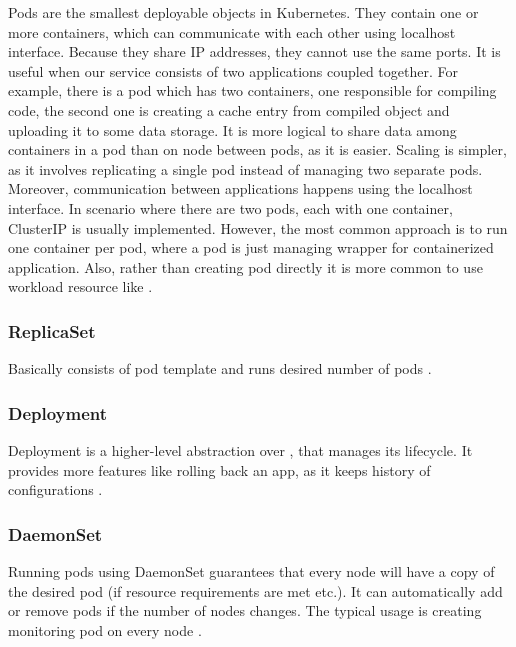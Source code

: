 Pods are the smallest deployable objects in Kubernetes. They contain one or more containers, which can communicate with each other using localhost interface. Because they share IP addresses, they cannot use the same ports. It is useful when our service consists of two applications coupled together. For example, there is a pod which has two containers, one responsible for compiling code, the second one is creating a cache entry from compiled object and uploading it to some data storage. It is more logical to share data among containers in a pod than on node between pods, as it is easier. Scaling is simpler, as it involves replicating a single pod instead of managing two separate pods. Moreover, communication between applications happens using the localhost interface. In scenario where there are two pods, each with one container, ClusterIP \textit{} is usually implemented. However, the most common approach is to run one container per pod, where a pod is just managing wrapper for containerized application. Also, rather than creating pod directly it is more common to use workload resource like \textit{} \cite{KubernetesDocs}. 


\subsubsection{ReplicaSet}
\label{replicaset}

Basically \textit{} consists of pod template and runs desired number of pods \cite{KubernetesDocs}. 


\subsubsection{Deployment}
\label{deployment}

Deployment is a higher-level abstraction over \textit{}, that manages its lifecycle. It provides more features like rolling back an app, as it keeps history of configurations \cite{KubernetesDocs}.

\subsubsection{DaemonSet}
\label{daemonset}

Running pods using DaemonSet guarantees that every node will have a copy of the desired pod (if resource requirements are met etc.). It can automatically add or remove pods if the number of nodes changes. The typical usage is creating monitoring pod on every node \cite{KubernetesDocs}. 


